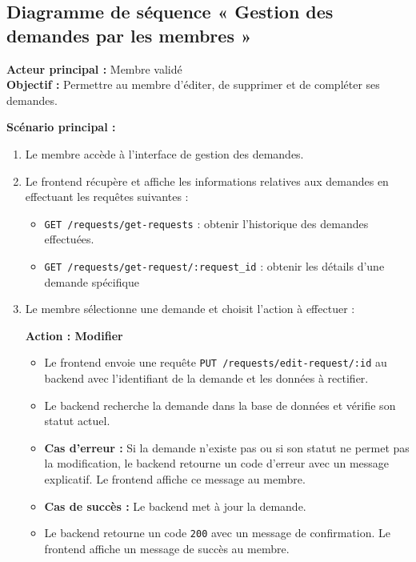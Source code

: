 \subsection{Diagramme de séquence « Gestion des demandes par les membres »}

\textbf{Acteur principal :} Membre validé \\
\textbf{Objectif :} Permettre au membre d'éditer, de supprimer et de compléter ses demandes.

\textbf{Scénario principal :}
\begin{enumerate}
  \item Le membre accède à l'interface de gestion des demandes.
  \item Le frontend récupère et affiche les informations relatives aux demandes en effectuant les requêtes suivantes :
  \begin{itemize}
      \item \texttt{GET /requests/get-requests} : obtenir l'historique des demandes effectuées.
      \item \texttt{GET /requests/get-request/:request\_id} : obtenir les détails d'une demande spécifique
  \end{itemize}
  \item Le membre sélectionne une demande et choisit l'action à effectuer :
  
  \textbf{Action : Modifier}
  \begin{itemize}
      \item Le frontend envoie une requête \texttt{PUT /requests/edit-request/:id} au backend avec l'identifiant de la demande et les données à rectifier.
      \item Le backend recherche la demande dans la base de données et vérifie son statut actuel.
      \item \textbf{Cas d'erreur :} Si la demande n'existe pas ou si son statut ne permet pas la modification, le backend retourne un code d'erreur avec un message explicatif. Le frontend affiche ce message au membre.
      \item \textbf{Cas de succès :} Le backend met à jour la demande.
      \item Le backend retourne un code \texttt{200} avec un message de confirmation. Le frontend affiche un message de succès au membre.
  \end{itemize}
  

\end{enumerate}
